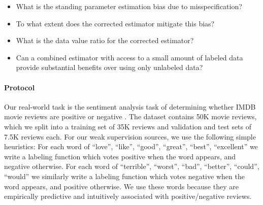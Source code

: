 \begin{itemize}
    \item What is the standing parameter estimation bias due to misspecification? 
    
    \item To what extent does the corrected estimator mitigate this bias?
    
    \item What is the data value ratio for the corrected estimator?  
    
    \item Can a combined estimator with access to a small amount of labeled data provide substantial benefits over using only unlabeled data?
\end{itemize}

\paragraph{Protocol} Our real-world task is the sentiment analysis task of determining whether IMDB movie reviews are positive or negative \citep{maas2011learning}. The dataset contains 50K movie reviews, which we split into a training set of 35K reviews and validation and test sets of 7.5K reviews each. For our weak supervision sources, we use the following simple heuristics: For each word  of ``love'', ``like'', ``good'', ``great'', ``best'', ``excellent'' we write a labeling function which votes positive when the word appears, and negative otherwise. For each word of ``terrible'', ``worst'', ``bad'', ``better'', ``could'', ``would'' we similarly write a labeling function which votes negative when the word appears, and positive otherwise. We use these words because they are empirically predictive and intuitively associated with positive/negative reviews.


